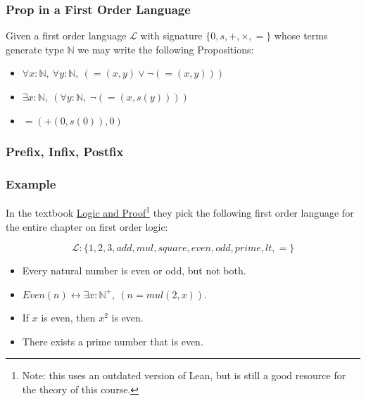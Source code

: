 \documentclass{beamer}
\theoremstyle{indentDefn} \newtheorem{defn}[]{Definition}
\begin{document}
\begin{frame}
	\frametitle{Prop in a First Order Language}
	
	Given a first order language $\mathcal{L}$ with signature $\{0,s,+,\times,=\}$ whose terms generate type $\mathbb{N}$ we may write the following Propositions:
	
	\begin{itemize}
		\item  $\forall x : \mathbb{N}, \ \forall y : \mathbb{N}, \ (=(x,y) \lor \lnot(=(x,y)))$
		\item  $\exists x : \mathbb{N}, \ (\forall y : \mathbb{N}, \ \lnot(=(x,s(y))))$
		\item $=(+(0,s(0)),0)$
	\end{itemize}
	
	\vspace{40mm}
\end{frame}

\begin{frame}
	\frametitle{Prefix, Infix, Postfix}
\end{frame}

\begin{frame}
	\frametitle{Example}
	
	In the textbook \href{https://leanprover.github.io/logic_and_proof_lean3/index.html}{Logic and Proof}\footnote{Note: this uses an outdated version of Lean, but is still a good resource for the theory of this course.} they pick the following first order language for the entire chapter on first order logic: 
	
	$$\mathcal{L}: \{1,2,3,add,mul,square,even,odd,prime,lt,=\}$$
	
	\begin{itemize}
		\item Every natural number is even or odd, but not both. \vspace{5mm}
		
		\item $Even(n) \leftrightarrow \exists x : \mathbb{N}^{+}, \ (n = mul(2,x))$. \vspace{5mm}
		
		\item If $x$ is even, then $x^{2}$ is even. \vspace{5mm}
		
		\item There exists a prime number that is even.
				
	\end{itemize}
\end{frame}
\end{document}
